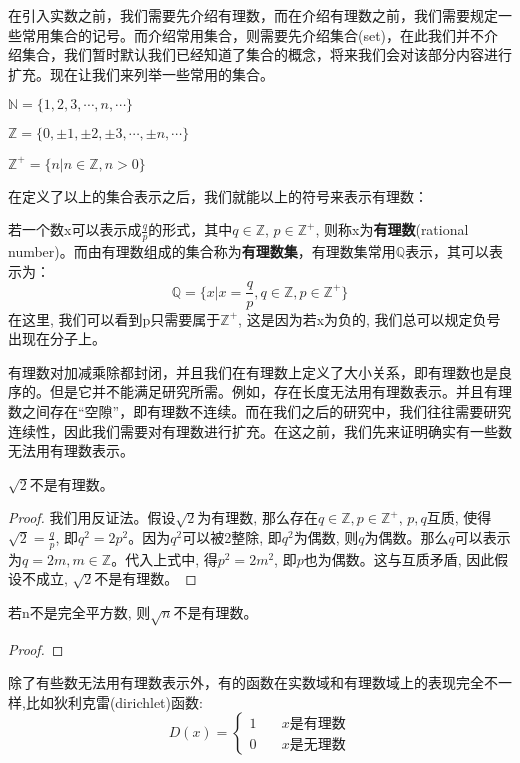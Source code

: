 \documentclass[lang=cn]{elegantbook}
\begin{document}
在引入实数之前，我们需要先介绍有理数，而在介绍有理数之前，我们需要规定一些常用集合的记号。而介绍常用集合，则需要先介绍集合(set)，在此我们并不介绍集合，我们暂时默认我们已经知道了集合的概念，将来我们会对该部分内容进行扩充。现在让我们来列举一些常用的集合。
\begin{definition}[常用集合表示]
$\mathbb{N} = \{ 1, 2, 3, \cdots, n, \cdots\}$

$\mathbb{Z} = \{ 0, \pm 1, \pm 2, \pm 3, \cdots, \pm n, \cdots \}$

$\mathbb{Z}^+ = \{ n | n \in \mathbb{Z}, n > 0 \}$
\end{definition}
在定义了以上的集合表示之后，我们就能以上的符号来表示有理数：
\begin{definition}[有理数] \label{def:rational-number} 
若一个数x可以表示成$\frac{q}{p}$的形式，其中$q \in \mathbb{Z}$, $p \in \mathbb{Z}^+$, 则称x为{\bf 有理数}(rational number)。而由有理数组成的集合称为{\bf 有理数集}，有理数集常用$\mathbb{Q}$表示，其可以表示为：
\[ \mathbb{Q} = \{ x | x = \frac{q}{p}, q \in \mathbb{Z}, p \in \mathbb{Z}^+ \} \]
在这里, 我们可以看到p只需要属于$\mathbb{Z}^+$, 这是因为若x为负的, 我们总可以规定负号出现在分子上。
\end{definition}
有理数对加减乘除都封闭，并且我们在有理数上定义了大小关系，即有理数也是良序的。但是它并不能满足研究所需。例如，存在长度无法用有理数表示。并且有理数之间存在``空隙''，即有理数不连续。而在我们之后的研究中，我们往往需要研究连续性，因此我们需要对有理数进行扩充。在这之前，我们先来证明确实有一些数无法用有理数表示。


\begin{proposition}
$\sqrt{2}$不是有理数。
\end{proposition}
\begin{proof}
我们用反证法。假设$\sqrt{2}$为有理数, 那么存在$q \in \mathbb{Z}, p \in \mathbb{Z}^+$, $p, q$互质, 使得$\sqrt{2} = \frac{q}{p}$, 即$q^2 = 2p^2$。因为$q^2$可以被2整除, 即$q^2$为偶数, 则$q$为偶数。那么$q$可以表示为$q = 2m, m \in \mathbb{Z}$。代入上式中, 得$p^2 = 2m^2$, 即$p$也为偶数。这与互质矛盾, 因此假设不成立, $\sqrt{2}$不是有理数。
\end{proof}
\begin{proposition}
    若n不是完全平方数, 则$\sqrt{n}$不是有理数。
\end{proposition}
\begin{proof}
\end{proof}
除了有些数无法用有理数表示外，有的函数在实数域和有理数域上的表现完全不一样,比如狄利克雷(dirichlet)函数:
\begin{equation*}
    D(x) = \left\{
        \begin{aligned}
            1 &\quad x\text{是有理数} \\
            0 &\quad x\text{是无理数}
        \end{aligned}
    \right.
\end{equation*}
\end{document}
